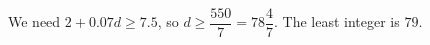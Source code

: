 We need $2+0.07d\ge7.5$, so $d\ge\dfrac{550}{7}=78\dfrac{4}{7}$. The least integer is $\boxed{79}$.

